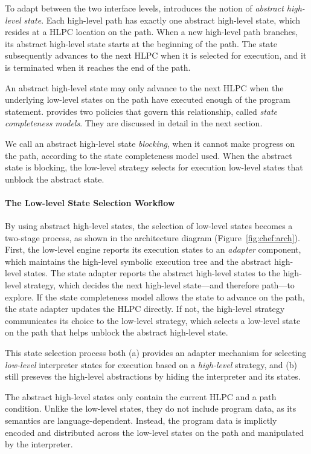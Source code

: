 To adapt between the two interface levels, \chef introduces the notion of \emph{abstract high-level state}.
%
Each high-level path has exactly one abstract high-level state, which resides at a HLPC location on the path.
%
When a new high-level path branches, its abstract high-level state starts at the beginning of the path.
%
The state subsequently advances to the next HLPC when it is selected for execution, and it is terminated when it reaches the end of the path.


An abstract high-level state may only advance to the next HLPC when the underlying low-level states on the path have executed enough of the program statement.
%
\chef provides two policies that govern this relationship, called \emph{state completeness models}.  They are discussed in detail in the next section.


We call an abstract high-level state \emph{blocking}, when it cannot make progress on the path, according to the state completeness model used.
%
When the abstract state is blocking, the low-level strategy selects for execution low-level states that unblock the abstract state.

\paragraph{The Low-level State Selection Workflow}

By using abstract high-level states, the selection of low-level states becomes a two-stage process, as shown in the architecture diagram (Figure~\ref{fig:chef:arch}).
%
First, the low-level engine reports its execution states to an \emph{adapter} component, which maintains the high-level symbolic execution tree and the abstract high-level states.
%
The state adapter reports the abstract high-level states to the high-level strategy, which decides the next high-level state---and therefore path---to explore.
%
If the state completeness model allows the state to advance on the path, the state adapter updates the HLPC directly.
%
If not, the high-level strategy communicates its choice to the low-level strategy, which selects a low-level state on the path that helps unblock the abstract high-level state.


This state selection process both (a) provides an adapter mechanism for selecting \emph{low-level} interpreter states for execution based on a \emph{high-level} strategy, and (b) still preseves the high-level abstractions by hiding the interpreter and its states.


The abstract high-level states only contain the current HLPC and a path condition.
%
Unlike the low-level states, they do not include program data, as its semantics are language-dependent.
%
Instead, the program data is implictly encoded and distributed across the low-level states on the path and manipulated by the interpreter.

